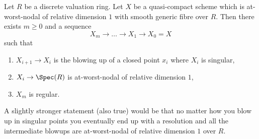 \begin{lemma}
\label{lemma-blowup-at-worst-nodal}
Let $R$ be a discrete valuation ring. Let $X$ be a quasi-compact scheme which
is at-worst-nodal of relative dimension $1$ with smooth generic fibre over $R$.
Then there exists $m \geq 0$ and a sequence
$$
X_m \to \ldots \to X_1 \to X_0 = X
$$
such that
\begin{enumerate}
\item $X_{i + 1} \to X_i$ is the blowing up of a closed point
$x_i$ where $X_i$ is singular,
\item $X_i \to \Spec(R)$ is at-worst-nodal of relative dimension $1$,
\item $X_m$ is regular.
\end{enumerate}
\end{lemma}

\noindent
A slightly stronger statement (also true) would be that no matter how
you blow up in singular points you eventually end up with a resolution
and all the intermediate blowups are
at-worst-nodal of relative dimension $1$ over $R$.

